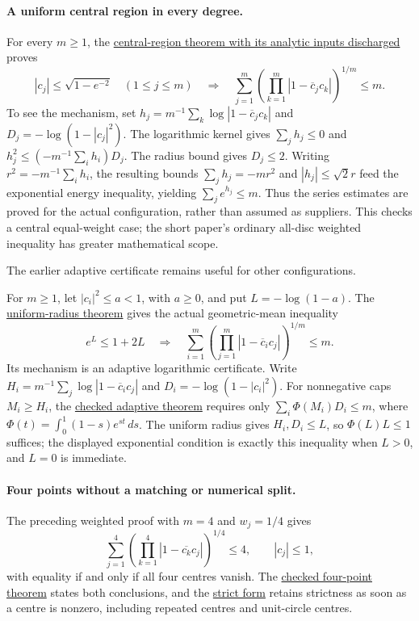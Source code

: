 \paragraph{A uniform central region in every degree.}
For every $m\ge1$, the
\href{https://github.com/wcook04/plectis-erdos/blob/3be82b1a7340284aea72e9a5c8493cb020843921/ErdosProblems/Erdos1041/FreePointCentralCompletion.lean#L39}{central-region theorem with its analytic inputs discharged}
proves
\[
 |c_j|\le\sqrt{1-e^{-2}}\quad(1\le j\le m)
 \quad\Longrightarrow\quad
 \sum_{j=1}^m\left(\prod_{k=1}^m|1-\overline c_jc_k|\right)^{1/m}\le m.
\]
To see the mechanism, set
$h_j=m^{-1}\sum_k\log|1-\overline c_jc_k|$ and
$D_j=-\log(1-|c_j|^2)$.  The logarithmic kernel gives
$\sum_jh_j\le0$ and
$h_j^2\le(-m^{-1}\sum_i h_i)D_j$.  The radius bound gives $D_j\le2$.
Writing $r^2=-m^{-1}\sum_i h_i$, the resulting bounds
$\sum_jh_j=-mr^2$ and $|h_j|\le\sqrt2r$ feed the exponential energy
inequality, yielding $\sum_j e^{h_j}\le m$.  Thus the series estimates are
proved for the actual configuration, rather than assumed as suppliers.
This checks a central equal-weight case; the short paper's ordinary
all-disc weighted inequality has greater mathematical scope.

The earlier adaptive certificate remains useful for other configurations.

For $m\ge1$, let $|c_i|^2\le a<1$, with $a\ge0$, and put
$L=-\log(1-a)$. The
\href{https://github.com/wcook04/plectis-erdos/blob/457e0c74b2666f7fb2d825c967e49e439a600b23/ErdosProblems/Erdos1041/FreePointUniformRadius.lean#L84}{uniform-radius theorem}
gives the actual geometric-mean inequality
\[
 e^L\le1+2L\quad\Longrightarrow\quad
 \sum_{i=1}^m\left(\prod_{j=1}^m|1-\overline c_i c_j|\right)^{1/m}\le m.
\]
Its mechanism is an adaptive logarithmic certificate. Write
$H_i=m^{-1}\sum_j\log|1-\overline c_i c_j|$ and
$D_i=-\log(1-|c_i|^2)$. For nonnegative caps $M_i\ge H_i$, the
\href{https://github.com/wcook04/plectis-erdos/blob/0d34630e1cc9d2b1ac6edfa7cfdba83b31bdc8fe/ErdosProblems/Erdos1041/LogKernelCentralCertificate.lean#L99}{checked adaptive theorem}
requires only $\sum_i\Phi(M_i)D_i\le m$, where
$\Phi(t)=\int_0^1(1-s)e^{st}\,ds$.
The uniform radius gives $H_i,D_i\le L$, so $\Phi(L)L\le1$
suffices; the displayed exponential condition is exactly this inequality
when $L>0$, and $L=0$ is immediate.

\paragraph{Four points without a matching or numerical split.}
The preceding weighted proof with $m=4$ and $w_j=1/4$ gives
\[
 \sum_{j=1}^4\left(\prod_{k=1}^4|1-\overline{c_k}c_j|\right)^{1/4}\le4,
 \qquad |c_j|\le1,
\]
with equality if and only if all four centres vanish. The
\href{https://github.com/wcook04/plectis-erdos/blob/3f1a5e9b284b9c3348eebd549e24c2f3972606ae/ErdosProblems/Erdos1041/PaperWeightedCoverageR11.lean\#L146}{checked four-point theorem}
states both conclusions, and the
\href{https://github.com/wcook04/plectis-erdos/blob/3f1a5e9b284b9c3348eebd549e24c2f3972606ae/ErdosProblems/Erdos1041/PaperWeightedCoverageR11.lean\#L128}{strict form}
retains strictness as soon as a centre
is nonzero, including repeated centres and unit-circle centres.

